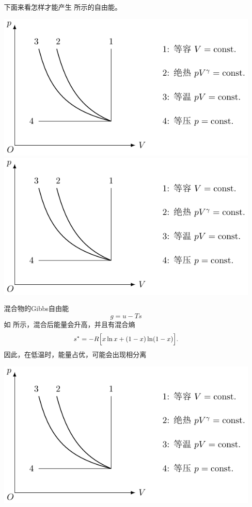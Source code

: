 \begin{example}
	{}{}
	下面来看怎样才能产生 所示的自由能。
	\begin{center}
		\includegraphics[page=19]{figures/tikz/coordinates.pdf}
		\includegraphics[page=20]{figures/tikz/coordinates.pdf}
		\label{fig:mixture-energy-entropy}
	\end{center}
	混合物的Gibbs自由能
	\[
		g=u-Ts
	\]
	如 所示，混合后能量会升高，并且有混合熵
	\[
		s^*=-R\Bigl[x\ln x+(1-x)\ln(1-x)\Bigr].
	\]
	因此，在低温时，能量占优，可能会出现相分离
	\begin{center}
		\includegraphics[page=21]{figures/tikz/coordinates.pdf}
	\end{center}
\end{example}
